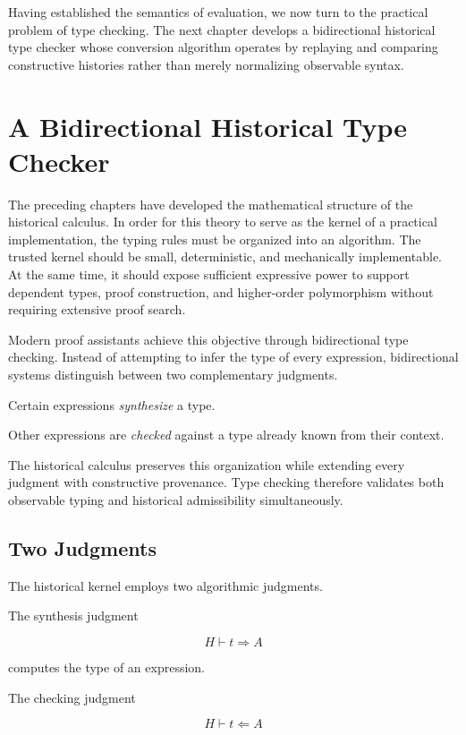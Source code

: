 \documentclass[12pt,oneside]{article}
\theoremstyle{definition}
\theoremstyle{remark}
\begin{document}
Having established the semantics of evaluation, we now turn to the practical
problem of type checking. The next chapter develops a bidirectional historical
type checker whose conversion algorithm operates by replaying and comparing
constructive histories rather than merely normalizing observable syntax.

\section{A Bidirectional Historical Type Checker}

The preceding chapters have developed the mathematical structure of the
historical calculus. In order for this theory to serve as the kernel of a
practical implementation, the typing rules must be organized into an algorithm.
The trusted kernel should be small, deterministic, and mechanically
implementable. At the same time, it should expose sufficient expressive power
to support dependent types, proof construction, and higher-order polymorphism
without requiring extensive proof search.

Modern proof assistants achieve this objective through bidirectional type
checking. Instead of attempting to infer the type of every expression,
bidirectional systems distinguish between two complementary judgments.

Certain expressions \emph{synthesize} a type.

Other expressions are \emph{checked} against a type already known from their
context.

The historical calculus preserves this organization while extending every
judgment with constructive provenance. Type checking therefore validates both
observable typing and historical admissibility simultaneously.

\subsection{Two Judgments}

The historical kernel employs two algorithmic judgments.

The synthesis judgment

\[
H
\vdash
t
\Rightarrow
A
\]

computes the type of an expression.

The checking judgment

\[
H
\vdash
t
\Leftarrow
A
\]
\end{document}
